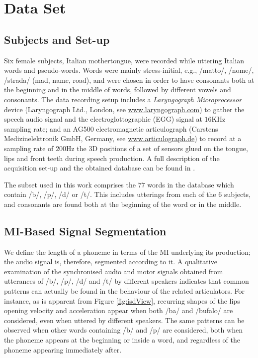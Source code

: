 \section{Data Set}
\label{sec:dataset}

\subsection{Subjects and Set-up}
\label{subsec:setup}

Six female subjects, Italian mothertongue, were recorded while uttering
Italian words and pseudo-words. Words were mainly stress-initial, e.g.,
/matto/, /nome/, /strada/ (mad, name, road), and were chosen in order
to have consonants both at the beginning and in the middle of
words, followed by different vowels and consonants.
The data recording setup includes a \emph{Laryngograph Microprocessor}
device (Laryngograph Ltd., London, see \url{www.laryngograph.com}) to gather the speech audio
signal and the electroglottographic (EGG) signal at $16$KHz sampling
rate; and an AG500 electromagnetic articulograph (Carstens Medizinelektronik
GmbH, Germany, see \url{www.articulograph.de}) to record at a sampling rate of $200$Hz the
3D positions of a set of sensors glued on the tongue, lips and front teeth
during speech production. A full description of the acquisition set-up and
the obtained database can be found in \cite{tavella}.

The subset used in this work comprises the $77$ words in the database
which contain /b/, /p/, /d/ or /t/. This includes utterings from each of the
$6$ subjects, and consonants are found both at the beginning of the word or
in the middle.

\subsection{MI-Based Signal Segmentation}
\label{subsec:segm}

We define the length of a phoneme in terms of the MI underlying its production;
the audio signal is, therefore, segmented according to it.
A qualitative examination of the synchronised audio and motor
signals obtained from utterances of /b/, /p/, /d/ and /t/
by different speakers indicates that common patterns can
actually be found in the behaviour of the related articulators.
For instance, as is apparent from Figure \ref{fig:isdView}, 
recurring shapes of the lips opening velocity and acceleration appear
when both /ba/ and /bufalo/ are considered, even when uttered by different
speakers. The same patterns can be observed when other words containing
/b/ and /p/ are considered, both when the phoneme appears at the beginning
or inside a word, and regardless of the phoneme appearing immediately after.

